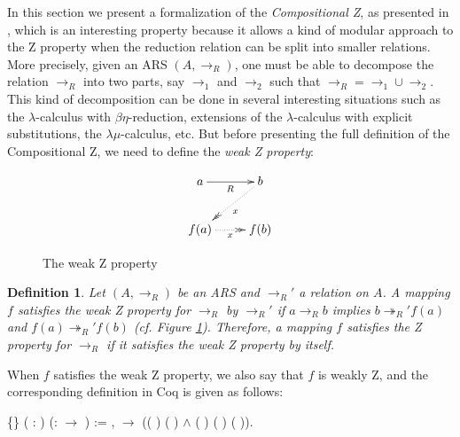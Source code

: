 \documentclass[a4paper]{article}
\newcommand{\tto}{\twoheadrightarrow}
\newtheorem{definition}{Definition}[section]
\begin{document}
In this section we present a formalization of the
\textit{Compositional Z}, as presented in \cite{Nakazawa-Fujita2016},
which is an interesting property because it allows a kind of modular
approach to the Z property when the reduction relation can be split
into smaller relations. More precisely, given an ARS $(A,\to_R)$, one
must be able to decompose the relation $\to_R$ into two parts, say
$\to_1$ and $\to_2$ such that $\to_R = \to_1\cup \to_2$. This kind of
decomposition can be done in several interesting situations such as
the $\lambda$-calculus with $\beta\eta$-reduction\cite{Ba84},
extensions of the $\lambda$-calculus with explicit
substitutions\cite{accl91}, the $\lambda\mu$-calculus\cite{Parigot92},
etc. But before presenting the full definition of the Compositional Z,
we need to define the \textit{weak Z property}:

\begin{figure}[h] \centering \[ \xymatrix{ a \ar[r]_R & b
      \ar@{.>>}[dl]^x\\ f(a) \ar@{.>>}[r]_x & f(b) \\ } \]
  \caption{The weak Z property}\label{fig:weakZ}
\end{figure}

\begin{definition} Let $(A,\to_R)$ be an ARS and $\to_R'$ a
  relation on $A$. A mapping $f$ satisfies the {\it weak Z
    property} for $\to_R$ by $\to_R'$ if $a\to_R b$ implies $b \tto_R'
  f(a)$ and $f(a) \tto_R' f(b)$ (cf. Figure
  \ref{fig:weakZ}). Therefore, a mapping $f$ satisfies the Z
  property for $\to_R$ if it satisfies the weak Z property by
  itself.
\end{definition}

When $f$ satisfies the weak Z property, we also say that $f$ is weakly
Z, and the corresponding definition in Coq is given as
follows: \begin{coqdoccode} \coqdocemptyline \coqdocnoindent
    \{\}
  ( :  )
  (:  \ensuremath{\rightarrow}
  ) := \coqdockw{\ensuremath{\forall}} 
  ,   
  \ensuremath{\rightarrow} (( )
   ( ) \ensuremath{\land}
  ( ) ( )
  ( )).\coqdoceol \coqdocemptyline
\end{coqdoccode}
\end{document}
